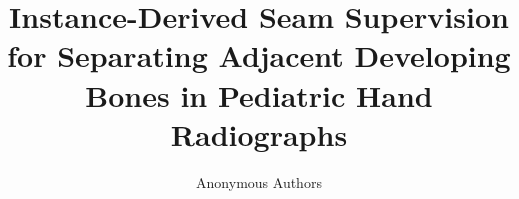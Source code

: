 \documentclass[letterpaper]{article}
\title{Instance-Derived Seam Supervision for Separating Adjacent Developing Bones in Pediatric Hand Radiographs}
\author{Anonymous Authors}
\begin{document}
\maketitle

\begin{abstract}

\end{abstract}










\appendix

\end{document}
